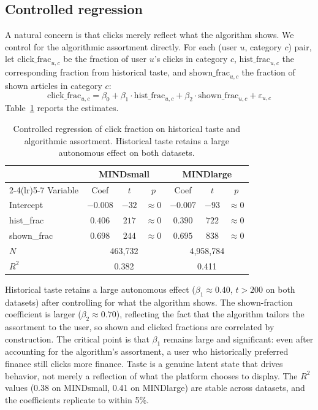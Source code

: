 \documentclass[11pt]{article}
\begin{document}
\subsection{Controlled regression}
\label{sec:regression}

A natural concern is that clicks merely reflect what the algorithm shows. We control for the algorithmic assortment directly. For each (user $u$, category $c$) pair, let $\text{click\_frac}_{u,c}$ be the fraction of user $u$'s clicks in category $c$, $\text{hist\_frac}_{u,c}$ the corresponding fraction from historical taste, and $\text{shown\_frac}_{u,c}$ the fraction of shown articles in category $c$:
\[
\text{click\_frac}_{u,c} = \beta_0 + \beta_1 \cdot \text{hist\_frac}_{u,c} + \beta_2 \cdot \text{shown\_frac}_{u,c} + \varepsilon_{u,c}
\]
Table~\ref{tab:controlled_reg} reports the estimates.

\begin{table}[ht]
\centering
\caption{Controlled regression of click fraction on historical taste and algorithmic assortment. Historical taste retains a large autonomous effect on both datasets.}
\label{tab:controlled_reg}
\begin{tabular}{lcccccc}
\toprule
 & \multicolumn{3}{c}{MINDsmall} & \multicolumn{3}{c}{MINDlarge} \\
\cmidrule(lr){2-4}\cmidrule(lr){5-7}
Variable & Coef & $t$ & $p$ & Coef & $t$ & $p$ \\
\midrule
Intercept & $-0.008$ & $-32$ & $\approx 0$ & $-0.007$ & $-93$ & $\approx 0$ \\
hist\_frac & $0.406$ & $217$ & $\approx 0$ & $0.390$ & $722$ & $\approx 0$ \\
shown\_frac & $0.698$ & $244$ & $\approx 0$ & $0.695$ & $838$ & $\approx 0$ \\
\midrule
$N$ & \multicolumn{3}{c}{463,732} & \multicolumn{3}{c}{4,958,784} \\
$R^2$ & \multicolumn{3}{c}{0.382} & \multicolumn{3}{c}{0.411} \\
\bottomrule
\end{tabular}
\end{table}
\FloatBarrier

Historical taste retains a large autonomous effect ($\beta_1 \approx 0.40$, $t > 200$ on both datasets) after controlling for what the algorithm shows. The shown-fraction coefficient is larger ($\beta_2 \approx 0.70$), reflecting the fact that the algorithm tailors the assortment to the user, so shown and clicked fractions are correlated by construction. The critical point is that $\beta_1$ remains large and significant: even after accounting for the algorithm's assortment, a user who historically preferred finance still clicks more finance. Taste is a genuine latent state that drives behavior, not merely a reflection of what the platform chooses to display. The $R^2$ values (0.38 on MINDsmall, 0.41 on MINDlarge) are stable across datasets, and the coefficients replicate to within 5\%.
\end{document}
